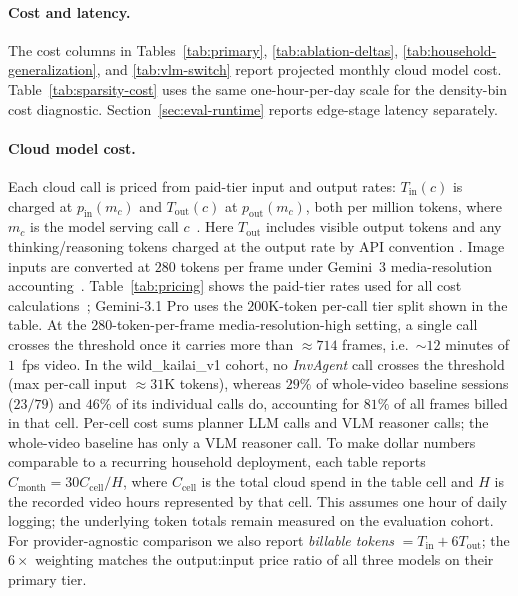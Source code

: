 \documentclass[sigconf,anonymous,nonacm]{acmart}
\newcommand{\sys}{\textit{InvAgent}\xspace}
\begin{document}
\paragraph{Cost and latency.}
The cost columns in Tables~\ref{tab:primary},
\ref{tab:ablation-deltas}, \ref{tab:household-generalization}, and
\ref{tab:vlm-switch} report projected monthly cloud model cost.
Table~\ref{tab:sparsity-cost} uses the same one-hour-per-day scale for
the density-bin cost diagnostic. Section~\ref{sec:eval-runtime}
reports edge-stage latency separately.

\paragraph{Cloud model cost.}
\label{sec:tokens}
Each cloud call is priced from paid-tier input and output rates:
$T_{\mathrm{in}}(c)$ is charged at $p_{\mathrm{in}}(m_c)$ and
$T_{\mathrm{out}}(c)$ at $p_{\mathrm{out}}(m_c)$, both per million
tokens, where $m_c$ is the model serving call
$c$~\cite{googleGeminiAPIPricing2026,openaiAPIPricing2026}.
Here $T_{\mathrm{out}}$ includes visible output tokens and any
thinking/reasoning tokens charged at the output rate by API convention
\cite{googleGeminiAPIPricing2026,openaiAPIPricing2026}. Image inputs
are converted at $280$ tokens per frame under Gemini~3 media-resolution
accounting~\cite{googleGeminiMediaResolution2026}. Table~\ref{tab:pricing}
shows the paid-tier rates used for all cost
calculations~\cite{googleGeminiAPIPricing2026,microsoftAzureOpenAIPricing2026};
Gemini-3.1 Pro uses the $200$K-token per-call tier split shown in the
table. At the $280$-token-per-frame media-resolution-high setting, a
single call crosses the threshold once it carries more than $\approx
714$ frames, i.e.\ $\sim 12$ minutes of $1$~fps video. In the
wild\_kailai\_v1 cohort, no \sys call crosses the threshold (max
per-call input $\approx 31$K tokens), whereas $29\%$ of whole-video
baseline sessions ($23/79$) and $46\%$ of its individual calls do,
accounting for $81\%$ of all frames billed in that cell. Per-cell cost
sums planner LLM calls and VLM reasoner calls; the whole-video baseline
has only a VLM reasoner call. To make dollar
numbers comparable to a recurring household deployment, each table
reports $C_{\mathrm{month}}=30C_{\mathrm{cell}}/H$, where
$C_{\mathrm{cell}}$ is the total cloud spend in the table cell and $H$
is the recorded video hours represented by that cell. This assumes one
hour of daily logging; the underlying token totals remain measured on
the evaluation cohort.
For provider-agnostic comparison we also report
\emph{billable tokens} $=T_{\mathrm{in}}+6T_{\mathrm{out}}$;
the $6\times$ weighting matches the output:input price ratio of all
three models on their primary tier.
\end{document}
